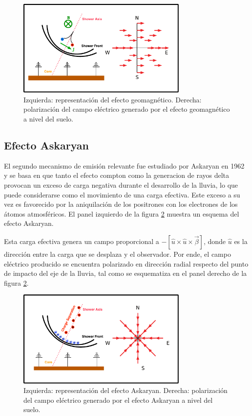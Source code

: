 	\begin{figure}[ht!]
		\centering
		\includegraphics[width=0.75\textwidth]{fig/EASRadio/geom_sketch}
		\caption{\label{fig:geom_sketch} Izquierda: representaci\'on del efecto geomagnético.
		Derecha: polarización del campo eléctrico generado por el efecto geomagnético a nivel del suelo.}
	\end{figure}
	
	\subsection{Efecto Askaryan}
	
	El segundo mecanismo de emisión relevante fue estudiado por Askaryan en 1962 \cite{askaryan1962} y se basa en que tanto el efecto compton como la generacion de rayos delta provocan un exceso de carga negativa durante el desarrollo de la lluvia, lo que puede considerarse como el movimiento de una carga efectiva.
	Este exceso a su vez es favorecido por la aniquilaci\'on de los positrones con los electrones de los \'atomos atmosf\'ericos. 
	El panel izquierdo de la figura \ref{fig:ask_sketch} muestra un esquema del efecto Askaryan.
	
	Esta carga efectiva genera un campo proporcional a $-\left[\hat u \times \hat u \times \vec\beta\right]$, donde $\hat u$ es la direcci\'on entre la carga que se desplaza y el observador.
	Por ende, el campo eléctrico producido se encuentra polarizado en dirección radial respecto del punto de impacto del eje de la lluvia, tal como se esquematiza en el panel derecho de la figura \ref{fig:ask_sketch}.
	
	\begin{figure}[ht!]
		\centering
		\includegraphics[width=0.75\textwidth]{fig/EASRadio/ask_sketch}
		\caption{\label{fig:ask_sketch} Izquierda: representaci\'on del efecto Askaryan.
		Derecha: polarización del campo eléctrico generado por el efecto Askaryan a nivel del suelo.}
	\end{figure}
	
